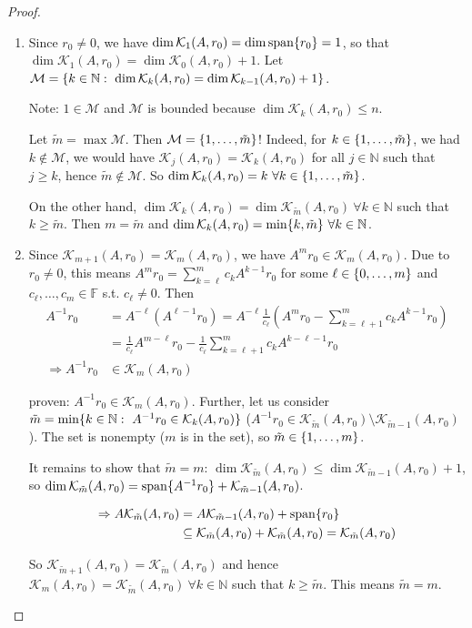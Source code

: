 \documentclass[12pt]{article}
\theoremstyle{definition}
\theoremstyle{remark}
\numberwithin{equation}{section}
\newcommand{\F}{\mathbb{F}}
\newcommand{\N}{\mathbb{N}}
\newcommand{\K}{\mathcal{K}}
\DeclarePairedDelimiter{\set}{\{}{\}}
\DeclareMathOperator{\mathspan}{span}
\begin{document}
\begin{proof}

  \begin{enumerate}[label=(\roman*)]
    \item Since $r_0 \neq 0$, we have $\dim\K_1(A,r_0) = \dim \mathspan \set{r_0} = 1$, so that $\dim \K_1(A,r_0) = \dim \K_0(A,r_0) + 1$. Let $\mathcal{M}=\set{k \in \N:\ \dim \K_k (A,r_0) = \dim \K_{k-1}(A,r_0) + 1}$.

      Note: $1 \in \mathcal{M}$ and $\mathcal{M}$ is bounded because $\dim \K_k(A,r_0) \leq n$.

      Let $\tilde{m} = \max\mathcal{M}$. Then $\mathcal{M} = \set{1,\ldots,\tilde{m}}$! Indeed, for $k \in \set{1, \ldots, \tilde{m}}$, we had $k \notin \mathcal{M}$, we would have $\K_j(A,r_0) = \K_k(A,r_0)$ for all $j \in \N$ such that $j \geq k$, hence $\tilde{m} \notin \mathcal{M}$. So $\dim \K_k(A,r_0) = k\ \forall k \in \set{1,\ldots,\tilde{m}}$.

      On the other hand, $\dim \K_k(A,r_0) = \dim \K_{\tilde{m}}(A,r_0)\ \forall k \in \N$ such that $k \geq \tilde{m}$. Then $m = \tilde{m}$ and $\dim \K_k(A,r_0) =  \min\set{k, \tilde{m}}\ \forall k \in \N$.

    \item Since $\K_{m+1}(A,r_0) = \K_m(A,r_0)$, we have $A^m r_0 \in \K_m(A,r_0)$. Due to $r_0 \neq 0$, this means $A^m r_0 = \sum_{k=\ell}^m c_k A^{k-1} r_0$ for some $\ell \in \set{0,\ldots,m}$ and $c_{\ell}, \ldots, c_m \in \F$ s.t. $c_\ell \neq 0$. Then
      \begin{align*}
        A^{-1} r_0  &= A^{-\ell} (A^{\ell-1}r_0 ) = A^{-\ell} \frac{1}{c_\ell} (A^m r_0 - \sum_{k=\ell+1}^m c_k A^{k-1} r_0)\\
        &= \frac{1}{c_\ell} A^{m-\ell} r_0 - \frac{1}{c_\ell} \sum_{k=\ell+1}^m c_k A^{k-\ell-1} r_0\\
        \Rightarrow A^{-1} r_0 &\in \K_m(A,r_0)
      \end{align*}

      proven: $A^{-1} r_0 \in \K_m(A,r_0)$. Further, let us consider $\tilde{m} = \min\set{k\in \N:\ A^{-1} r_0 \in \K_k(A,r_0)}$ ($A^{-1} r_0 \in \K_{\tilde{m}}(A,r_0) \setminus \K_{\tilde{m}-1}(A,r_0)$). The set is nonempty ($m$ is in the set), so $\tilde{m} \in \set{1,\ldots,m}$.

      It remains to show that $\tilde{m} = m$: $\dim \K_{\tilde{m}}(A,r_0) \leq \dim \K_{\tilde{m}-1}(A,r_0) + 1$, so $\dim \K_{\tilde{m}}(A,r_0) = \mathspan \set{A^{-1} r_0} + \K_{\tilde{m}-1}(A,r_0)$.

      \begin{align*}
        \Rightarrow A \K_{\tilde{m}}(A,r_0) &= A \K_{\tilde{m}-1}(A,r_0) + \mathspan \set{r_0}\\
        &\subseteq \K_{\tilde{m}}(A,r_0) + \K_{\tilde{m}}(A,r_0) = \K_{\tilde{m}}(A,r_0)
      \end{align*}

      So $\K_{\tilde{m}+1}(A,r_0) = \K_{\tilde{m}}(A,r_0)$ and hence $\K_{m}(A,r_0) = \K_{\tilde{m}}(A,r_0)\ \forall k \in \N$ such that $k \geq \tilde{m}$. This means $\tilde{m} = m$.
  \end{enumerate}
\end{proof}
\end{document}
